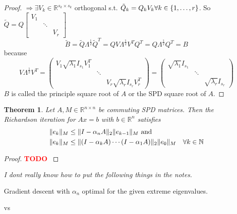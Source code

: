 \documentclass[12pt]{article}
\newcounter{lecture}
\newtheorem{theorem}{Theorem}[lecture]
\theoremstyle{definition}
\theoremstyle{remark}
\numberwithin{equation}{section}
\newcommand{\R}{\mathbb{R}}
\newcommand{\N}{\mathbb{N}}
\newcommand{\TODO}[1][]{\textcolor{red}{\textbf{TODO\ifblank{#1}{}{:\ }#1} }}
\DeclarePairedDelimiter{\norm}{\lVert}{\rVert}
\DeclarePairedDelimiter{\set}{\{}{\}}
\begin{document}
\begin{proof}
  $\Rightarrow \exists V_k \in \R^{s_k \times s_k}$ orthogonal s.t. $\tilde{Q}_k = Q_k V_k \forall k \in \set{1,\ldots,r}$. So $\tilde{Q} = Q
  \begin{bmatrix}
    V_1 & & \\
    & \ddots & \\
    & & V_r
  \end{bmatrix}$
  \begin{equation*}
    \tilde{B} = \tilde{Q} \Lambda^{\frac{1}{2}} \tilde{Q}^T = Q V \Lambda^{\frac{1}{2}} V^T Q^T = Q \Lambda^{\frac{1}{2}} Q^T = B
  \end{equation*}
  because
  \begin{equation*}
    V \Lambda^{\frac{1}{2}} V^T =
    \begin{pmatrix}
      V_1 \sqrt{ \lambda_1 } I_{s_1} V_1^T & & \\
      & \ddots & \\
      & & V_r \sqrt{ \lambda_r } I_{s_r} V_r^T
    \end{pmatrix} =
    \begin{pmatrix}
      \sqrt{\lambda_1} I_{s_1} & & \\
      & \ddots & \\
      & & \sqrt{\lambda_r} I_{s_r}
    \end{pmatrix}
  \end{equation*}
  $B$ is called the principle square root of $A$ or the SPD square root of $A$.
\end{proof}
\begin{theorem}
  \label{thm:richardson-error}
  Let $A, M \in \R^{n\times n}$ be commuting SPD matrices. Then the Richardson iteration for $Ax = b$ with $b \in \R^n$ satisfies
  \begin{align*}
    \norm{e_k}_M &\leq \norm{I - \alpha_n A}_2 \norm{e_{k-1}}_M \text{ and} \\
    \norm{e_k}_M &\leq \norm{(I-\alpha_k A)\cdots (I-\alpha_1 A)}_2 \norm{e_0}_M \quad \forall k \in \N
  \end{align*}
\end{theorem}
\begin{proof}
  \TODO[]
\end{proof}

\emph{I dont really know how to put the following things in the notes.}

\begin{mdframed}
  Gradient descent with $\alpha_n$ optimal for the given extreme eigenvalues.
\end{mdframed}
vs
\end{document}
